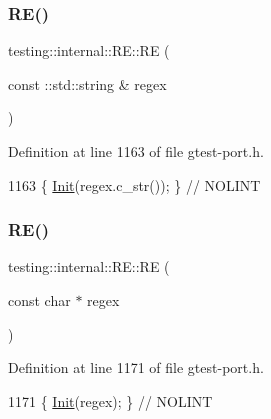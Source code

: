 \subsubsection{\texorpdfstring{R\+E()}{RE()}\hspace{0.1cm}{\footnotesize\ttfamily [2/3]}}
{\footnotesize\ttfamily testing\+::internal\+::\+R\+E\+::\+RE (\begin{DoxyParamCaption}\item[{const \+::std\+::string \&}]{regex }\end{DoxyParamCaption})\hspace{0.3cm}{\ttfamily [inline]}}



Definition at line 1163 of file gtest-\/port.\+h.


\begin{DoxyCode}
1163 \{ \hyperlink{classtesting_1_1internal_1_1RE_a4c3a519ce849abc57d6d5fffbf1e04dc}{Init}(regex.c\_str()); \}  \textcolor{comment}{// NOLINT}
\end{DoxyCode}
\mbox{\label{classtesting_1_1internal_1_1RE_a908ea936a5b7a14479a1b292a7189ca6}} 
\subsubsection{\texorpdfstring{R\+E()}{RE()}\hspace{0.1cm}{\footnotesize\ttfamily [3/3]}}
{\footnotesize\ttfamily testing\+::internal\+::\+R\+E\+::\+RE (\begin{DoxyParamCaption}\item[{const char $\ast$}]{regex }\end{DoxyParamCaption})\hspace{0.3cm}{\ttfamily [inline]}}



Definition at line 1171 of file gtest-\/port.\+h.


\begin{DoxyCode}
1171 \{ \hyperlink{classtesting_1_1internal_1_1RE_a4c3a519ce849abc57d6d5fffbf1e04dc}{Init}(regex); \}  \textcolor{comment}{// NOLINT}
\end{DoxyCode}
\mbox{\label{classtesting_1_1internal_1_1RE_af3ad18e6c0b433f3d85ed23eda8119f3}} 
